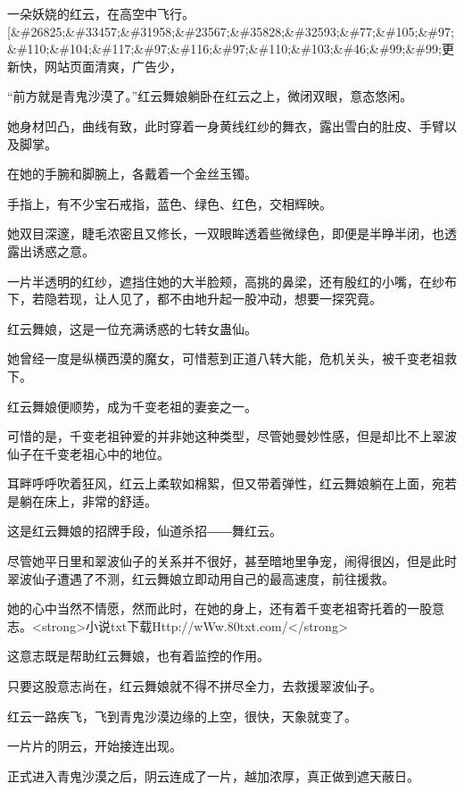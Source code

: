 
\begin{this_body}

一朵妖娆的红云，在高空中飞行。[\&\#26825;\&\#33457;\&\#31958;\&\#23567;\&\#35828;\&\#32593;\&\#77;\&\#105;\&\#97;\&\#110;\&\#104;\&\#117;\&\#97;\&\#116;\&\#97;\&\#110;\&\#103;\&\#46;\&\#99;\&\#99;更新快，网站页面清爽，广告少，

“前方就是青鬼沙漠了。”红云舞娘躺卧在红云之上，微闭双眼，意态悠闲。

她身材凹凸，曲线有致，此时穿着一身黄线红纱的舞衣，露出雪白的肚皮、手臂以及脚掌。

在她的手腕和脚腕上，各戴着一个金丝玉镯。

手指上，有不少宝石戒指，蓝色、绿色、红色，交相辉映。

她双目深邃，睫毛浓密且又修长，一双眼眸透着些微绿色，即便是半睁半闭，也透露出诱惑之意。

一片半透明的红纱，遮挡住她的大半脸颊，高挑的鼻梁，还有殷红的小嘴，在纱布下，若隐若现，让人见了，都不由地升起一股冲动，想要一探究竟。

红云舞娘，这是一位充满诱惑的七转女蛊仙。

她曾经一度是纵横西漠的魔女，可惜惹到正道八转大能，危机关头，被千变老祖救下。

红云舞娘便顺势，成为千变老祖的妻妾之一。

可惜的是，千变老祖钟爱的并非她这种类型，尽管她曼妙性感，但是却比不上翠波仙子在千变老祖心中的地位。

耳畔呼呼吹着狂风，红云上柔软如棉絮，但又带着弹性，红云舞娘躺在上面，宛若是躺在床上，非常的舒适。

这是红云舞娘的招牌手段，仙道杀招――舞红云。

尽管她平日里和翠波仙子的关系并不很好，甚至暗地里争宠，闹得很凶，但是此时翠波仙子遭遇了不测，红云舞娘立即动用自己的最高速度，前往援救。

她的心中当然不情愿，然而此时，在她的身上，还有着千变老祖寄托着的一股意志。<strong>小说txt下载Http://wWw.80txt.com/</strong>

这意志既是帮助红云舞娘，也有着监控的作用。

只要这股意志尚在，红云舞娘就不得不拼尽全力，去救援翠波仙子。

红云一路疾飞，飞到青鬼沙漠边缘的上空，很快，天象就变了。

一片片的阴云，开始接连出现。

正式进入青鬼沙漠之后，阴云连成了一片，越加浓厚，真正做到遮天蔽日。


\end{this_body}
